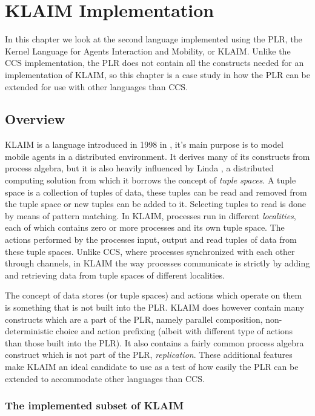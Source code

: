\chapter{KLAIM Implementation}\label{ch:klaim}

	In this chapter we look at the second language implemented using the PLR, 
	the Kernel Language for Agents Interaction and Mobility, or KLAIM. Unlike 
	the CCS implementation, the PLR does not contain all the constructs needed 
	for an implementation of KLAIM, so this chapter is a case study in how the 
	PLR can be extended for use with other languages than CCS.
	
\section{Overview}
	
	KLAIM is a language introduced in 1998 in \cite{klaim}, it's main purpose is 
	to model mobile agents in a distributed environment. It derives many of its 
	constructs from process algebra, but it is also heavily influenced by 
	Linda \cite{linda1, linda2}, a distributed computing solution from which it 
	borrows the concept of \textit{tuple spaces}. A tuple space is a collection 
	of tuples of data, these tuples can be read and removed from the tuple space 
	or new tuples can be added to it. Selecting tuples to read is done by means 
	of pattern matching. In KLAIM, processes run in different 
	\textit{localities}, each of which contains zero or more processes 
	and its own tuple space. The actions performed by the processes input, 
	output and read tuples of data from these tuple spaces. Unlike CCS, where 
	processes synchronized with each other through channels, in KLAIM the way 
	processes communicate is strictly by adding and retrieving data from tuple 
	spaces of different localities. 
	
	The concept of data stores (or tuple spaces) and actions which operate on 
	them is something that is not built into the PLR. KLAIM does however contain 
	many constructs which are a part of the PLR, namely parallel composition, 
	non-deterministic choice and action prefixing (albeit with different type of 
	actions than those built into the PLR). It also contains a fairly common 
	process algebra construct which is not part of the PLR, 
	\textit{replication}. These additional features make KLAIM an ideal 
	candidate to use as a test of how easily the PLR can be extended to 
	accommodate other languages than CCS.
	
	\subsection{The implemented subset of KLAIM}
	
